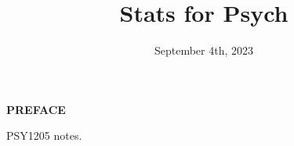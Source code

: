 \documentclass[titlepage]{book}
\title{\textbf{\huge{Stats for Psych}}}
\date{September 4th, 2023}
\begin{document}
\maketitle


\begin{center}
    \textbf{\Large{PREFACE}}
\end{center}

PSY1205 notes.

\vspace{\baselineskip}


\pagestyle{empty}
    \renewcommand{\baselinestretch}{0.94}\normalsize
            \tableofcontents
    \renewcommand{\baselinestretch}{1.0}\normalsize
\restoregeometry
\pagestyle{fancy}

\clearpage










\end{document}
